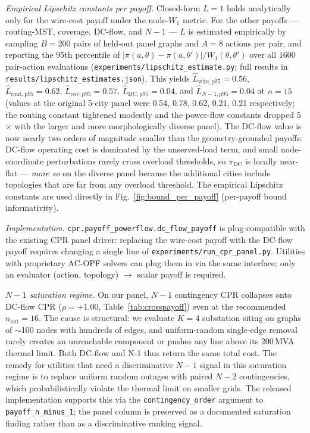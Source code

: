 \documentclass[10pt,a4paper]{article}
\begin{document}
\textit{Empirical Lipschitz constants per payoff.} Closed-form
$L = 1$ holds analytically only for the wire-cost payoff under
the node-$W_1$ metric. For the other payoffs --- routing-MST,
coverage, DC-flow, and $N\!-\!1$ --- $L$ is estimated empirically by
sampling $B = 200$ pairs of held-out panel graphs and $A = 8$
actions per pair, and reporting the 95th percentile of
$|\pi(a, \theta) - \pi(a, \theta')| / W_1(\theta, \theta')$ over
all $1600$ pair-action evaluations
(\texttt{experiments/lipschitz\_estimate.py}; full results in
\texttt{results/lipschitz\_estimates.json}). This yields
$\hat L_{\mathrm{wire}, \mathrm{p95}} = 0.56$,
$\hat L_{\mathrm{rout}, \mathrm{p95}} = 0.62$,
$\hat L_{\mathrm{cov}, \mathrm{p95}} = 0.57$,
$\hat L_{\mathrm{DC}, \mathrm{p95}} = 0.04$, and
$\hat L_{N\!-\!1, \mathrm{p95}} = 0.04$ at $n = 15$ (values at the
original 5-city panel were 0.54, 0.78, 0.62, 0.21, 0.21
respectively; the routing constant tightened modestly and the
power-flow constants dropped 5$\times$ with the larger and more
morphologically diverse panel). The DC-flow value is now nearly
two orders of magnitude smaller than the geometry-grounded payoffs:
DC-flow operating cost is dominated by the unserved-load term, and
small node-coordinate perturbations rarely cross overload
thresholds, so $\pi_{\mathrm{DC}}$ is locally near-flat ---
\emph{more so} on the diverse panel because the additional cities
include topologies that are far from any overload threshold. The empirical Lipschitz constants are used directly
in Fig.~\ref{fig:bound_per_payoff} (per-payoff bound
informativity).

\textit{Implementation.} \texttt{cpr.payoff\_powerflow.dc\_flow\_payoff}
is plug-compatible with the existing CPR panel driver: replacing
the wire-cost payoff with the DC-flow payoff requires changing a
single line of \texttt{experiments/run\_cpr\_panel.py}. Utilities
with proprietary AC-OPF solvers can plug them in via the same
interface; only an evaluator (action, topology) $\to$ scalar
payoff is required.

\textit{$N\!-\!1$ saturation regime.} On our panel, $N\!-\!1$
contingency CPR collapses onto DC-flow CPR
($\rho = +1.00$, Table~\ref{tab:crosspayoff}) even at the
recommended $n_{\mathrm{out}} = 16$. The cause is structural: we
evaluate $K = 4$ substation siting on graphs of $\sim$100 nodes
with hundreds of edges, and uniform-random single-edge removal
rarely creates an unreachable component or pushes any line above
its $200$\,MVA thermal limit. Both DC-flow and N-1 thus return
the same total cost. The remedy for utilities that need a
discriminative $N\!-\!1$ signal in this saturation regime is to
replace uniform random outages with paired $N\!-\!2$
contingencies, which probabilistically violate the thermal
limit on smaller grids. The released implementation supports
this via the \texttt{contingency\_order} argument to
\texttt{payoff\_n\_minus\_1}; the panel column is preserved as
a documented saturation finding rather than as a discriminative
ranking signal.
\end{document}
